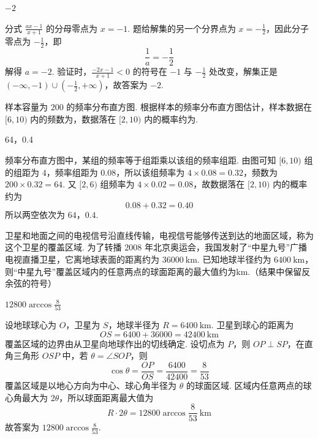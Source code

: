 \begin{answer}
\(-2\)
\end{answer}

\begin{solution}
分式 \(\frac{ax-1}{x+1}\) 的分母零点为 \(x=-1\). 题给解集的另一个分界点为 \(x=-\frac12\)，因此分子零点为 \(-\frac12\)，即
\[
\frac1a=-\frac12
\]
解得 \(a=-2\). 验证时，\(\frac{-2x-1}{x+1}<0\) 的符号在 \(-1\) 与 \(-\frac12\) 处改变，解集正是 \((-\infty,-1)\cup(-\frac12,+\infty)\)，故答案为 \(-2\).
\end{solution}

\begin{problem}
\noindent 样本容量为 \(200\) 的频率分布直方图.
根据样本的频率分布直方图估计，样本数据在 \([6, 10)\) 内的频数为\fillinblank{}，数据落在 \([2, 10)\) 内的概率约为\fillinblank{}.

\end{problem}

\begin{answer}
64，0.4
\end{answer}

\begin{solution}
频率分布直方图中，某组的频率等于组距乘以该组的频率组距. 由图可知 \([6,10)\) 组的组距为 \(4\)，频率组距为 \(0.08\)，所以该组频率为 \(4\times0.08=0.32\)，频数为 \(200\times0.32=64\). 又 \([2,6)\) 组频率为 \(4\times0.02=0.08\)，故数据落在 \([2,10)\) 内的概率约为
\[
0.08+0.32=0.40
\]
所以两空依次为 \(64\)，\(0.4\).
\end{solution}

\begin{problem}
卫星和地面之间的电视信号沿直线传输，电视信号能够传送到达的地面区域，称为这个卫星的覆盖区域. 为了转播 2008 年北京奥运会，我国发射了“中星九号”广播电视直播卫星，它离地球表面的距离约为 \(36000\mathrm{~km}\). 已知地球半径约为 \(6400\mathrm{~km}\)，则“中星九号”覆盖区域内的任意两点的球面距离的最大值约为\fillinblank{}\(\mathrm{km}\).（结果中保留反余弦的符号）
\end{problem}

\begin{answer}
\(12800\arccos\frac{8}{53}\)
\end{answer}

\begin{solution}
设地球球心为 \(O\)，卫星为 \(S\)，地球半径为 \(R=6400\mathrm{~km}\). 卫星到球心的距离为
\[
OS=6400+36000=42400\mathrm{~km}
\]
覆盖区域的边界由从卫星向地球作出的切线确定. 设切点为 \(P\)，则 \(OP\perp SP\)，在直角三角形 \(OSP\) 中，若 \(\theta=\angle SOP\)，则
\[
\cos\theta=\frac{OP}{OS}=\frac{6400}{42400}=\frac8{53}
\]
覆盖区域是以地心方向为中心、球心角半径为 \(\theta\) 的球面区域. 区域内任意两点的球心角最大为 \(2\theta\)，所以球面距离最大值为
\[
R\cdot2\theta=12800\arccos\frac8{53}\ \mathrm{km}
\]
故答案为 \(12800\arccos\frac8{53}\).
\end{solution}


